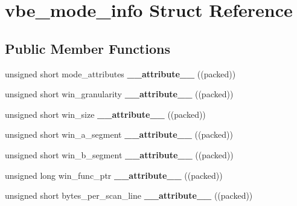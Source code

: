 \hypertarget{structvbe__mode__info}{}\section{vbe\+\_\+mode\+\_\+info Struct Reference}
\label{structvbe__mode__info}
\subsection*{Public Member Functions}
\begin{DoxyCompactItemize}
\item 
\mbox{\label{structvbe__mode__info_ab0ffa1252e5daa4703be7c98ebb19c8c}} 
unsigned short mode\+\_\+attributes {\bfseries \+\_\+\+\_\+attribute\+\_\+\+\_\+} ((packed))
\item 
\mbox{\label{structvbe__mode__info_adfe61a1e8d06ca56006ea0b4879b731b}} 
unsigned short win\+\_\+granularity {\bfseries \+\_\+\+\_\+attribute\+\_\+\+\_\+} ((packed))
\item 
\mbox{\label{structvbe__mode__info_a4c7710f929d8ec77d01e2c9b372e816b}} 
unsigned short win\+\_\+size {\bfseries \+\_\+\+\_\+attribute\+\_\+\+\_\+} ((packed))
\item 
\mbox{\label{structvbe__mode__info_a160d6efa253af949049034c45e78a9c3}} 
unsigned short win\+\_\+a\+\_\+segment {\bfseries \+\_\+\+\_\+attribute\+\_\+\+\_\+} ((packed))
\item 
\mbox{\label{structvbe__mode__info_a014df3a0c72cc60ffa20d5d54d2521fd}} 
unsigned short win\+\_\+b\+\_\+segment {\bfseries \+\_\+\+\_\+attribute\+\_\+\+\_\+} ((packed))
\item 
\mbox{\label{structvbe__mode__info_a185b3a5fea4557584cabcd87fd4593ba}} 
unsigned long win\+\_\+func\+\_\+ptr {\bfseries \+\_\+\+\_\+attribute\+\_\+\+\_\+} ((packed))
\item 
\mbox{\label{structvbe__mode__info_a015f7ad51d739bb53b590e269c88027e}} 
unsigned short bytes\+\_\+per\+\_\+scan\+\_\+line {\bfseries \+\_\+\+\_\+attribute\+\_\+\+\_\+} ((packed))
\item 

\end{DoxyCompactItemize}
